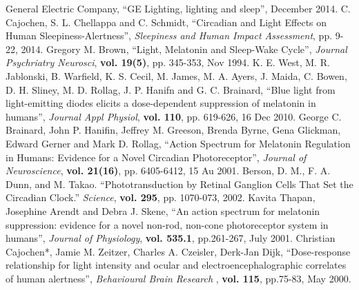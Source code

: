 \begin{thebibliography}{5}

 General Electric Company, ``GE Lighting, lighting and sleep'', December 2014.
 C. Cajochen, S. L. Chellappa and C. Schmidt, ``Circadian and Light Effects on Human Sleepiness-Alertness'', \emph{Sleepiness and Human Impact Assessment}, pp. 9-22, 2014.
 Gregory M. Brown, ``Light, Melatonin and Sleep-Wake Cycle'', \emph{Journal Psychriatry Neurosci}, {\bf vol. 19(5)}, pp. 345-353, Nov 1994.
 K. E. West, M. R. Jablonski, B. Warfield, K. S. Cecil, M. James, M. A. Ayers, J. Maida, C. Bowen, D. H. Sliney, M. D. Rollag, J. P. Hanifn and G. C. Brainard, ``Blue light from light-emitting diodes elicits a dose-dependent suppression of melatonin in humans'', \emph{Journal Appl Physiol}, {\bf vol. 110}, pp. 619-626, 16 Dec 2010.
 George C. Brainard, John P. Hanifin, Jeffrey M. Greeson, Brenda Byrne, Gena Glickman, Edward Gerner and Mark D. Rollag, ``Action Spectrum for Melatonin Regulation in Humans: Evidence for a Novel Circadian Photoreceptor'', \emph{Journal of Neuroscience}, {\bf vol. 21(16)}, pp. 6405-6412, 15 Au 2001.
 Berson, D. M., F. A. Dunn, and M. Takao. ``Phototransduction by Retinal Ganglion Cells That Set the Circadian Clock.'' \emph{Science}, {\bf vol. 295}, pp. 1070-073, 2002.
 Kavita Thapan, Josephine Arendt and Debra J. Skene, ``An action spectrum for melatonin suppression: evidence for a novel non-rod, non-cone photoreceptor system in humans'', \emph{Journal of Physiology}, {\bf vol. 535.1}, pp.261-267, July 2001.
 Christian  Cajochen*,  Jamie  M.  Zeitzer,  Charles  A.  Czeisler,  Derk-Jan  Dijk, ``Dose-response  relationship  for  light  intensity  and  ocular  and electroencephalographic  correlates  of  human  alertness'', \emph{Behavioural Brain Research }, {\bf vol. 115}, pp.75-83, May 2000.

\end{thebibliography}
